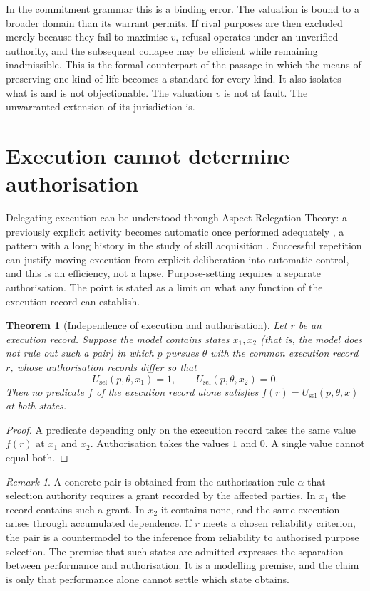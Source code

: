 \documentclass[11pt]{article}
\newtheorem{theorem}{Theorem}
\theoremstyle{definition}
\theoremstyle{remark}
\newtheorem{remark}{Remark}
\begin{document}
In the commitment grammar this is a binding error. The valuation is bound to a broader domain than its warrant permits. If rival purposes are then excluded merely because they fail to maximise $v$, refusal operates under an unverified authority, and the subsequent collapse may be efficient while remaining inadmissible. This is the formal counterpart of the passage in which the means of preserving one kind of life becomes a standard for every kind. It also isolates what is and is not objectionable. The valuation $v$ is not at fault. The unwarranted extension of its jurisdiction is.

\section{Execution cannot determine authorisation}

Delegating execution can be understood through Aspect Relegation Theory: a previously explicit activity becomes automatic once performed adequately \cite{flyxionART}, a pattern with a long history in the study of skill acquisition \cite{fittsposner1967,anderson1982}. Successful repetition can justify moving execution from explicit deliberation into automatic control, and this is an efficiency, not a lapse. Purpose-setting requires a separate authorisation. The point is stated as a limit on what any function of the execution record can establish.

\begin{theorem}[Independence of execution and authorisation]\label{thm:indep}
Let $r$ be an execution record. Suppose the model contains states $x_1,x_2$ (that is, the model does not rule out such a pair) in which $p$ pursues $\theta$ with the common execution record $r$, whose authorisation records differ so that
\[
U_{\mathrm{sel}}(p,\theta,x_1)=1,\qquad U_{\mathrm{sel}}(p,\theta,x_2)=0.
\]
Then no predicate $f$ of the execution record alone satisfies $f(r)=U_{\mathrm{sel}}(p,\theta,x)$ at both states.
\end{theorem}
\begin{proof}
A predicate depending only on the execution record takes the same value $f(r)$ at $x_1$ and $x_2$. Authorisation takes the values $1$ and $0$. A single value cannot equal both. \qedhere
\end{proof}

\begin{remark}
A concrete pair is obtained from the authorisation rule $\alpha$ that selection authority requires a grant recorded by the affected parties. In $x_1$ the record contains such a grant. In $x_2$ it contains none, and the same execution arises through accumulated dependence. If $r$ meets a chosen reliability criterion, the pair is a countermodel to the inference from reliability to authorised purpose selection. The premise that such states are admitted expresses the separation between performance and authorisation. It is a modelling premise, and the claim is only that performance alone cannot settle which state obtains.
\end{remark}
\end{document}
